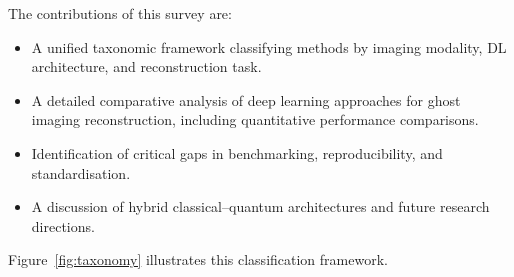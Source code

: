The contributions of this survey are:
\begin{itemize}
    \item A unified taxonomic framework classifying methods by imaging modality, DL architecture, and reconstruction task.
    \item A detailed comparative analysis of deep learning approaches for ghost imaging reconstruction, including quantitative performance comparisons.
    \item Identification of critical gaps in benchmarking, reproducibility, and standardisation.
    \item A discussion of hybrid classical--quantum architectures and future research directions.
\end{itemize}

\noindent Figure~\ref{fig:taxonomy} illustrates this classification framework.

